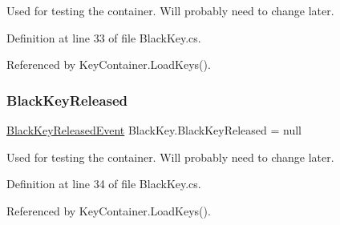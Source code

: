 Used for testing the container. Will probably need to change later. 



Definition at line 33 of file Black\+Key.\+cs.



Referenced by Key\+Container.\+Load\+Keys().

\mbox{\label{group___black_key_events_ga2710bdaba16dbdb82c0d38f11ce642d8}} 
\subsubsection{\texorpdfstring{Black\+Key\+Released}{BlackKeyReleased}}
{\footnotesize\ttfamily \hyperlink{group___black_key_event_types_class_black_key_1_1_black_key_released_event}{Black\+Key\+Released\+Event} Black\+Key.\+Black\+Key\+Released = null}



Used for testing the container. Will probably need to change later. 



Definition at line 34 of file Black\+Key.\+cs.



Referenced by Key\+Container.\+Load\+Keys().

